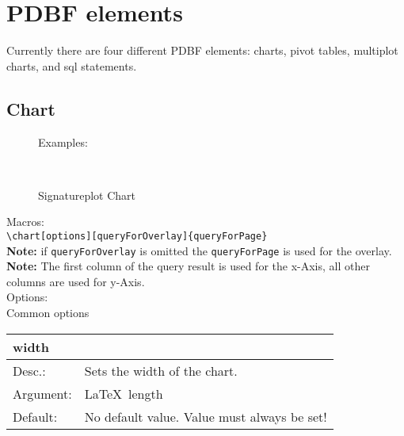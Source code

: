 \documentclass[11pt]{scrartcl}
\def\a{5cm}
\def\b{10.5cm}
\def\option#1#2#3#4{%
\noindent \begin{tabular}{|p{\a}|p{\b}|}
\hline
\textbf{#1} & \\
\hline
Desc.: & #2 \\
\hline
Argument: & #3\\
\hline
Default:& #4\\
\hline
\end{tabular} \\[4pt]%
}
\begin{document}
\newpage
\section{PDBF elements}
Currently there are four different PDBF elements: charts, pivot tables, multiplot charts, and sql statements.

\subsection{Chart}
\begin{figure}[h!]%
\hspace{-218pt}Examples:\\
    \centering
    \begin{minipage}{.48\textwidth}
    \caption{Line Chart}
    \end{minipage}
    \hspace{11pt}
    \begin{minipage}{.48\textwidth}
    \caption{Bar Chart}
    \end{minipage} \\[8pt]
    
    \begin{minipage}{1.0\textwidth}
    \caption{Signatureplot Chart}
    \end{minipage}
\end{figure}

\noindent Macros: \\[3pt]
\verb|\chart[options][queryForOverlay]{queryForPage}| \\
\textbf{Note:} if \verb|queryForOverlay| is omitted the \verb|queryForPage| is used for the overlay.\\
\textbf{Note:} The first column of the query result is used for the x-Axis, all other columns are used for y-Axis.\\[8pt] 
\noindent Options:\\[3pt]
%
Common options\\[4pt]
%
\option
{width}
{Sets the width of the chart.}
{\LaTeX~length}
{No default value. Value must always be set!}
\end{document}
